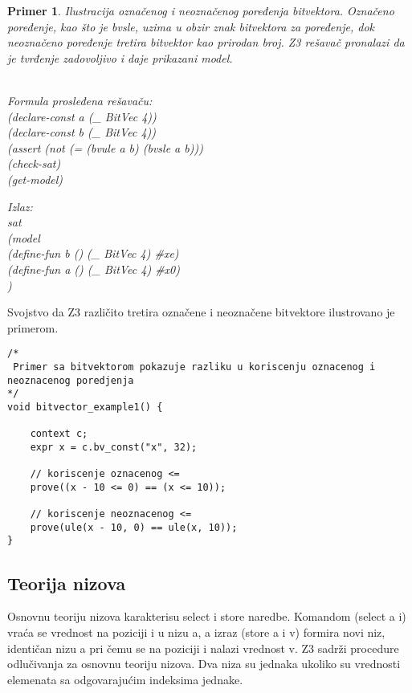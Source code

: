 \documentclass[12pt,oneside]{memoir}
\newtheorem{primer}{Primer}
\begin{document}
\begin{primer} Ilustracija označenog i neoznačenog poređenja bitvektora. Označeno poređenje, kao što je bvsle, uzima u obzir znak bitvektora za poređenje, dok neoznačeno poređenje tretira bitvektor kao prirodan broj. Z3 rešavač pronalazi da je tvrđenje zadovoljivo i daje prikazani model.
\\ \\
\begin{minipage}[b]{0.5\textwidth}
Formula prosleđena rešavaču:
\\(declare-const a (\_ BitVec 4))
\\(declare-const b (\_ BitVec 4))
\\(assert (not (= (bvule a b) (bvsle a b)))
\\(check-sat)
\\(get-model)
\end{minipage}
\hspace{1.15cm} 
\begin{minipage}[t]{0.5\textwidth}
\vspace{-3.4cm}
Izlaz:
\\sat 
\\(model 
\\(define-fun b () (\_ BitVec 4) \#xe) 
\\(define-fun a () (\_ BitVec 4) \#x0)
\\)
\end{minipage}


\end{primer}
Svojstvo da Z3 različito tretira označene i neoznačene bitvektore ilustrovano je  primerom.
\\ 
\begin{lstlisting}
/*
 Primer sa bitvektorom pokazuje razliku u koriscenju oznacenog i neoznacenog poredjenja
*/
void bitvector_example1() {

    context c;
    expr x = c.bv_const("x", 32);
    
    // koriscenje oznacenog <=
    prove((x - 10 <= 0) == (x <= 10));

    // koriscenje neoznacenog <=
    prove(ule(x - 10, 0) == ule(x, 10));
}

\end{lstlisting}

\subsection{Teorija nizova} 
Osnovnu teoriju nizova karakterisu select i store naredbe. 
Komandom (select a i) vraća se vrednost na poziciji i u nizu a, a izraz (store a i v) formira novi niz, identičan nizu a pri čemu se na poziciji i nalazi vrednost v.
Z3 sadrži procedure odlučivanja za osnovnu teoriju nizova.
Dva niza su jednaka ukoliko su vrednosti elemenata sa odgovarajućim indeksima jednake.
 
\end{document}
